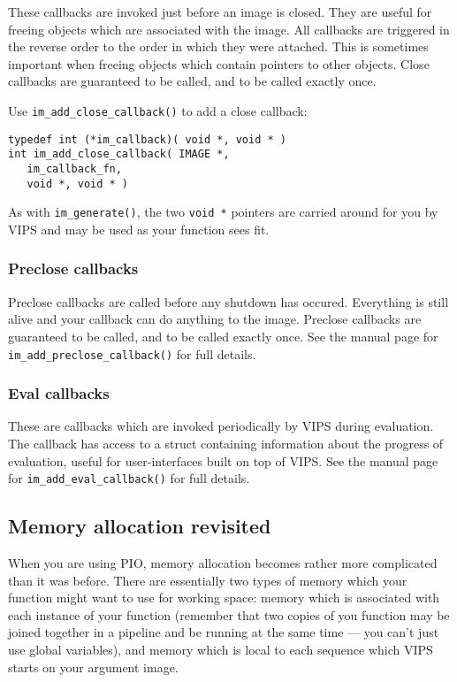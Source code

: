 These callbacks are invoked just before an image is closed. They are useful
for freeing objects which are associated with the image. All callbacks are
triggered in the reverse order to the order in which they were attached. This
is sometimes important when freeing objects which contain pointers to
other objects. Close callbacks are guaranteed to be called, and to be called
exactly once.

Use \verb+im_add_close_callback()+ to add a close callback:

\begin{verbatim}
typedef int (*im_callback)( void *, void * )
int im_add_close_callback( IMAGE *, 
   im_callback_fn, 
   void *, void * ) 
\end{verbatim}
   
As with \verb+im_generate()+, the two \verb+void *+ pointers
are carried around for you by VIPS and may be used as your
function sees fit.

\subsubsection{Preclose callbacks}

Preclose callbacks are called before any shutdown has occured. Everything is
still alive and your callback can do anything to the image. Preclose callbacks
are guaranteed to be called, and to be called exactly once. See the manual
page for \verb+im_add_preclose_callback()+ for full details.

\subsubsection{Eval callbacks}

These are callbacks which are invoked periodically by VIPS during evaluation.
The callback has access to a struct containing information about the progress
of evaluation, useful for user-interfaces built on top of VIPS. See the
manual page for \verb+im_add_eval_callback()+ for full details.

\subsection{Memory allocation revisited}

When you are using PIO, memory allocation becomes rather more complicated than
it was before. There are essentially two types of memory which your function
might want to use for working space: memory which is associated with each
instance of your function (remember that two copies of you function may be
joined together in a pipeline and be running at the same time --- you can't
just use global variables), and memory which is local to each sequence
which VIPS starts on your argument image.

